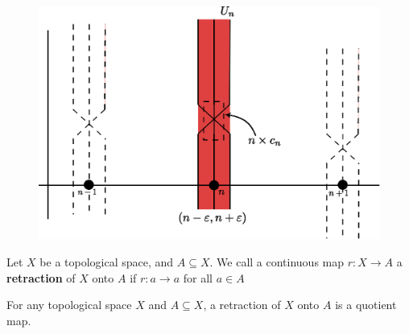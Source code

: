 \begin{example}
\begin{enumerate}
            \begin{figure}[h]
                \centering
                \includegraphics[scale=0.5]{Figures/Chapter2/figure22_8.eps}
                \caption{}
                \label{fig_2.8}
            \end{figure}
    \end{enumerate}
\end{example}

\begin{definition}
    Let $X$ be a topological space, and  $A \subseteq X$. We call a continuous
    map $r:X \rightarrow A$ a \textbf{retraction} of $X$ onto  $A$ if
    $r:a \rightarrow a$ for all $a \in A$
\end{definition}

\begin{lemma}\label{}
    For any topological space $X$ and  $A \subseteq X$, a retraction of  $X$
    onto  $A$ is a quotient map.
\end{lemma}
